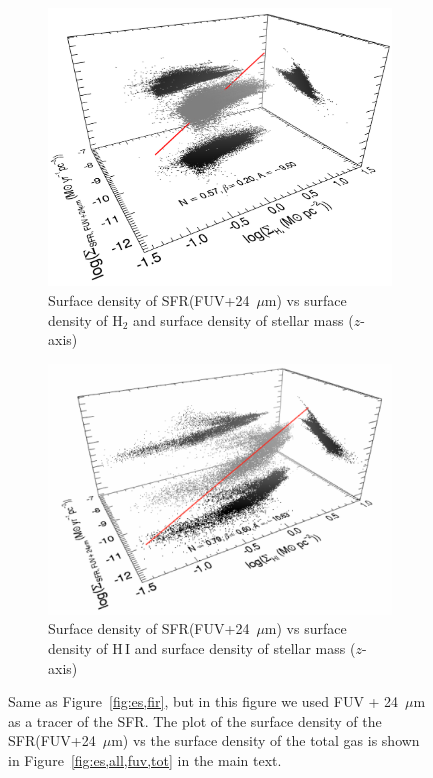 \begin{figure}
    \centering
     \begin{subfigure}[b]{0.5\textwidth}
        \centering
        \includegraphics[width=\textwidth]{../image_paper1/es_tot_fuv_vs_h22_f.png}
        \caption{Surface density of SFR(FUV+24~$\mu$m) vs surface density of H$_2$ and surface density of stellar mass ($z$-axis)}
        \label{fig:es,all,fuv,h2}
    \end{subfigure}
     \hfill
   \begin{subfigure}[b]{0.5\textwidth}
        \centering
        \includegraphics[width=\textwidth]{../image_paper1/es_tot_fuv_vs_hi2.png}
        \caption{Surface density of SFR(FUV+24~$\mu$m) vs surface density of H\,{\sc I} and surface density of stellar mass ($z$-axis)}
        \label{fig:es,all,fuv,hi}
    \end{subfigure}
   \caption{Same as Figure~\ref{fig:es,fir}, but in this figure we used FUV + 24~$\mu$m as a tracer of the SFR. The plot of the surface density of the SFR(FUV+24~$\mu$m) vs the surface density of the total gas is shown in Figure~\ref{fig:es,all,fuv,tot} in the main text.}
\end{figure}

